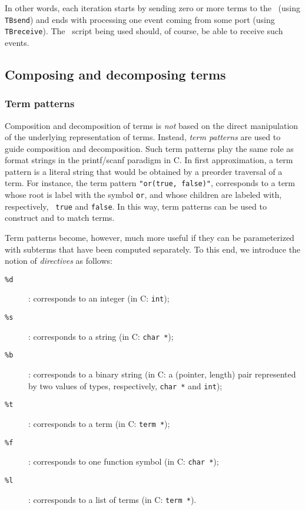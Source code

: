 In other words, each iteration starts by sending zero or more terms
to the \TB\ (using {\tt TBsend}) and ends with processing one event
coming from some port (using {\tt TBreceive}).  The \T\ script being used
should, of course, be able to receive such events.


\subsection{\label{Compose}Composing and decomposing terms}

\subsubsection{\label{Patterns}Term patterns}
Composition and decomposition of terms is {\em not} based on the
direct manipulation of the underlying representation of terms.
Instead, {\em term patterns} are used to guide composition and
decomposition.  Such term patterns play the same role as format
strings in the printf/scanf paradigm in C.  In first approximation, a
term pattern is a literal string that would be obtained by a preorder
traversal of a term.  For instance, the term pattern {\tt "or(true,
false)"}, corresponds to a term whose root is label with the symbol
{\tt or}, and whose children are labeled with, respectively, {\tt
true} and {\tt false}. In this way, term patterns can be used to
construct and to match terms.

Term patterns become, however, much more useful if they can be parameterized
with subterms that have been computed separately.
To this end, we introduce the notion of {\em directives} as follows:

\begin{description}
\item[{\tt \%d}]: corresponds to an integer (in C: {\tt int});
\item[{\tt \%s}]: corresponds to a string (in C: {\tt char *});
\item[{\tt \%b}]: corresponds to a binary string (in C: a (pointer, length) pair 
represented by two values of types, respectively, {\tt char *} and {\tt int});
\item[{\tt \%t}]: corresponds to a term (in C: {\tt term *});
\item[{\tt \%f}]: corresponds to one function symbol (in C: {\tt char *});
\item[{\tt \%l}]: corresponds to a list of terms (in C: {\tt term *}).
\end{description}

